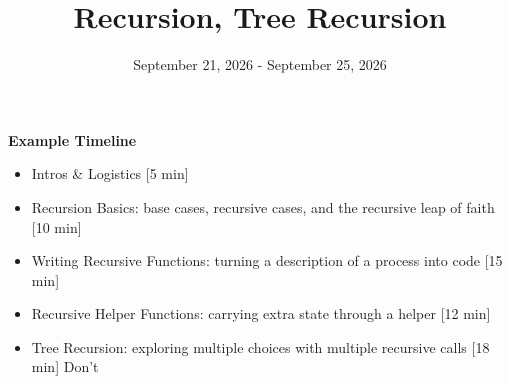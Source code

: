 \documentclass{exam}
\title{Recursion, Tree Recursion}
\date{September 21, 2026 - September 25, 2026}
\begin{document}
\maketitle

\begin{meta}
    \textbf{Example Timeline}
    \begin{itemize}
        \item Intros \& Logistics [5 min]
        \item Recursion Basics: base cases, recursive cases, and the recursive leap of faith [10 min]
        \item Writing Recursive Functions: turning a description of a process into code [15 min]
        \item Recursive Helper Functions: carrying extra state through a helper [12 min]
        \item Tree Recursion: exploring multiple choices with multiple recursive calls [18 min]
        \subitem Don't 
    \end{itemize}
\end{meta}
\end{document}
